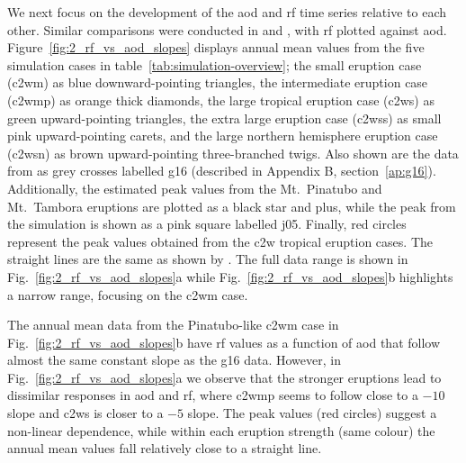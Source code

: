 \documentclass{ametsocV6.1}
\begin{document}
We next focus on the development of the \gls{aod} and \gls{rf} time series relative to
each other. Similar comparisons were conducted in \citet[][their Fig.\ 4]{gregory2016}
and \citet[][their Fig.\ 1]{marshall2020}, with \gls{rf} plotted against \gls{aod}.
Figure~\ref{fig:2_rf_vs_aod_slopes} displays annual mean values from the five simulation
cases in table~\ref{tab:simulation-overview}; the small eruption case (\gls{c2wm}) as
blue downward-pointing triangles, the intermediate eruption case (\gls{c2wmp}) as orange
thick diamonds, the large tropical eruption case (\gls{c2ws}) as green upward-pointing
triangles, the extra large eruption case (\gls{c2wss}) as small pink upward-pointing
carets, and the large northern hemisphere eruption case (\gls{c2wsn}) as brown
upward-pointing three-branched twigs. Also shown are the data from \citet[][Fig.\ 4,
  black crosses from HadCM3 sstPiHistVol]{gregory2016} as grey crosses labelled \gls{g16}
(described in Appendix B, section~\ref{ap:g16}). Additionally, the estimated peak values
from the Mt.\ Pinatubo and Mt.\ Tambora eruptions are plotted as a black star and plus,
while the peak from the \citet{jones2005} simulation is shown as a pink square labelled
\gls{j05}. Finally, red circles represent the peak values obtained from the \gls{c2w}
tropical eruption cases. The straight lines are the same as shown by
\citet{gregory2016}. The full data range is shown in Fig.~\ref{fig:2_rf_vs_aod_slopes}a
while Fig.~\ref{fig:2_rf_vs_aod_slopes}b highlights a narrow range, focusing on the
\gls{c2wm} case.

The annual mean data from the Pinatubo-like \gls{c2wm} case in
Fig.~\ref{fig:2_rf_vs_aod_slopes}b have \gls{rf} values as a function of \gls{aod} that
follow almost the same constant slope as the \gls{g16} data. However, in
Fig.~\ref{fig:2_rf_vs_aod_slopes}a we observe that the stronger eruptions lead to
dissimilar responses in \gls{aod} and \gls{rf}, where \gls{c2wmp} seems to follow close
to a \(-10\) slope and \gls{c2ws} is closer to a \(-5\) slope. The peak values (red
circles) suggest a non-linear dependence, while within each eruption strength (same
colour) the annual mean values fall relatively close to a straight line.
\end{document}
